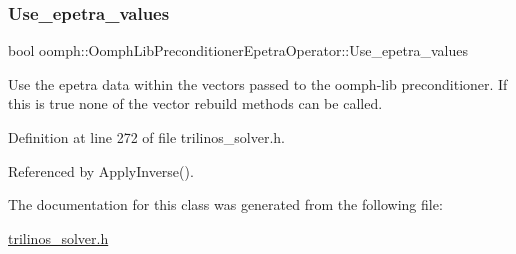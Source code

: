 \mbox{\label{classoomph_1_1OomphLibPreconditionerEpetraOperator_a47942736149f13371582896aedf80f24}} 
\subsubsection{\texorpdfstring{Use\+\_\+epetra\+\_\+values}{Use\_epetra\_values}}
{\footnotesize\ttfamily bool oomph\+::\+Oomph\+Lib\+Preconditioner\+Epetra\+Operator\+::\+Use\+\_\+epetra\+\_\+values\hspace{0.3cm}{\ttfamily [private]}}



Use the epetra data within the vectors passed to the oomph-\/lib preconditioner. If this is true none of the vector rebuild methods can be called. 



Definition at line 272 of file trilinos\+\_\+solver.\+h.



Referenced by Apply\+Inverse().



The documentation for this class was generated from the following file\+:\begin{DoxyCompactItemize}
\item 
\hyperlink{trilinos__solver_8h}{trilinos\+\_\+solver.\+h}\end{DoxyCompactItemize}
